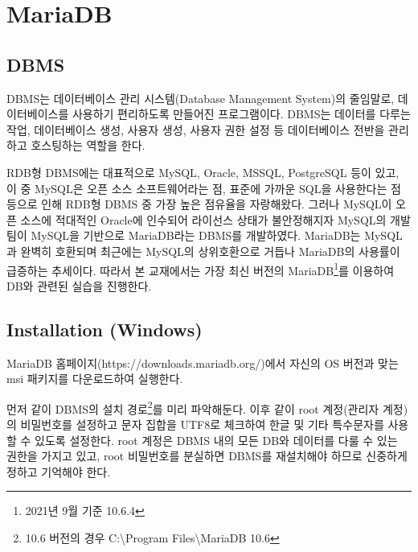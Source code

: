 \section{MariaDB}\label{sect:maria-db}

\subsection*{DBMS}

DBMS는 데이터베이스 관리 시스템(Database Management System)의 줄임말로, 데이터베이스를 사용하기 편리하도록 만들어진 프로그램이다. DBMS는 데이터를 다루는 작업, 데이터베이스 생성, 사용자 생성, 사용자 권한 설정 등 데이터베이스 전반을 관리하고 호스팅하는 역할을 한다.

RDB형 DBMS에는 대표적으로 MySQL, Oracle, MSSQL, PostgreSQL 등이 있고, 이 중 MySQL은 오픈 소스 소프트웨어라는 점, 표준에 가까운 SQL을 사용한다는 점 등으로 인해 RDB형 DBMS 중 가장 높은 점유율을 자랑해왔다. 그러나 MySQL이 오픈 소스에 적대적인 Oracle에 인수되어 라이선스 상태가 불안정해지자 MySQL의 개발팀이 MySQL을 기반으로 MariaDB라는 DBMS를 개발하였다. MariaDB는 MySQL과 완벽히 호환되며 최근에는 MySQL의 상위호환으로 거듭나 MariaDB의 사용률이 급증하는 추세이다. 따라서 본 교재에서는 가장 최신 버전의 MariaDB\footnote{2021년 9월 기준 10.6.4}를 이용하여 DB와 관련된 실습을 진행한다.

\subsection*{Installation (Windows)}

MariaDB 홈페이지(https://downloads.mariadb.org/)에서 자신의 OS 버전과 맞는 msi 패키지를 다운로드하여 실행한다.


먼저 \과 같이 DBMS의 설치 경로\footnote{10.6 버전의 경우 C:\textbackslash{}Program Files\textbackslash{}MariaDB 10.6}를 미리 파악해둔다. 이후 \와 같이 root 계정(관리자 계정)의 비밀번호를 설정하고 문자 집합을 UTF8로 체크하여 한글 및 기타 특수문자를 사용할 수 있도록 설정한다. root 계정은 DBMS 내의 모든 DB와 데이터를 다룰 수 있는 권한을 가지고 있고, root 비밀번호를 분실하면 DBMS를 재설치해야 하므로 신중하게 정하고 기억해야 한다.

